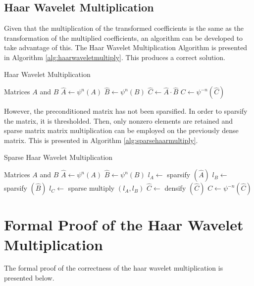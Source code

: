 \subsection{Haar Wavelet Multiplication}

Given that the multiplication of the transformed coefficients is the
same as the transformation of the multiplied coefficients, an
algorithm can be developed to take advantage of this. The Haar Wavelet
Multiplication Algorithm is presented in Algorithm
\ref{alg:haarwaveletmultiply}. This produces a correct solution. 

\begin{algorithm}
\caption{ Haar Wavelet Multiplication}
\label{alg:haarwaveletmultiply}
\begin{algorithmic}
\REQUIRE Matrices $A$ and $B$
\STATE $\hat A \leftarrow \psi^n(A)$
\STATE $\hat B \leftarrow \psi^n(B)$
\STATE $\hat C \leftarrow \hat A \cdot \hat B$
\STATE $C \leftarrow \psi^{-n}\left(\hat C\right)$
\end{algorithmic}
\end{algorithm}

However, the preconditioned matrix has not been sparsified. In order to
sparsify the matrix, it is thresholded. Then, only nonzero elements are
retained and sparse matrix matrix multiplication can be employed on the
previously dense matrix. This is presented in Algorithm \ref{alg:sparsehaarmultiply}.


\begin{algorithm}
\caption{ Sparse Haar Wavelet Multiplication}
\label{alg:sparsehaarmultiply}
\begin{algorithmic}
\REQUIRE Matrices $A$ and $B$
\STATE $\hat A \leftarrow \psi^n(A)$
\STATE $\hat B \leftarrow \psi^n(B)$
\STATE $l_A \leftarrow$ sparsify $\left(\hat A\right)$
\STATE $l_B \leftarrow$ sparsify $\left(\hat B\right)$
\STATE $l_C \leftarrow$ sparse multiply $\left(l_A, l_B \right)$
\STATE $\hat C \leftarrow$ densify $\left(\hat C \right)$
\STATE $C \leftarrow \psi^{-n}\left(\hat C\right)$
\end{algorithmic}
\end{algorithm}
	

\section{Formal Proof of the Haar Wavelet Multiplication}

The formal proof of the correctness of the haar wavelet multiplication is presented below.


